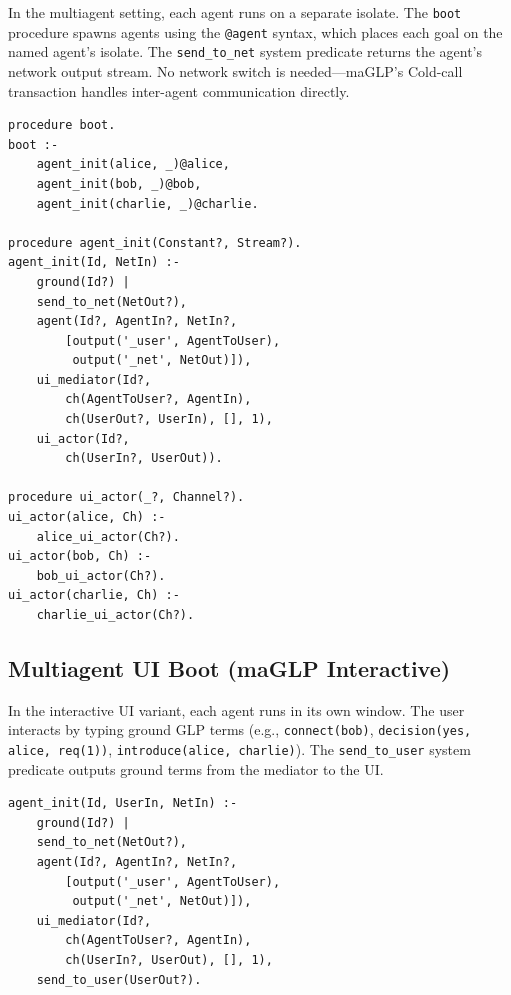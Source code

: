 In the multiagent setting, each agent runs on a separate isolate. The \verb|boot| procedure spawns agents using the \verb|@agent| syntax, which places each goal on the named agent's isolate. The \verb|send_to_net| system predicate returns the agent's network output stream. No network switch is needed---maGLP's Cold-call transaction handles inter-agent communication directly.

\begin{verbatim}
procedure boot.
boot :-
    agent_init(alice, _)@alice,
    agent_init(bob, _)@bob,
    agent_init(charlie, _)@charlie.

procedure agent_init(Constant?, Stream?).
agent_init(Id, NetIn) :-
    ground(Id?) |
    send_to_net(NetOut?),
    agent(Id?, AgentIn?, NetIn?,
        [output('_user', AgentToUser),
         output('_net', NetOut)]),
    ui_mediator(Id?,
        ch(AgentToUser?, AgentIn),
        ch(UserOut?, UserIn), [], 1),
    ui_actor(Id?,
        ch(UserIn?, UserOut)).

procedure ui_actor(_?, Channel?).
ui_actor(alice, Ch) :-
    alice_ui_actor(Ch?).
ui_actor(bob, Ch) :-
    bob_ui_actor(Ch?).
ui_actor(charlie, Ch) :-
    charlie_ui_actor(Ch?).
\end{verbatim}

\subsection{Multiagent UI Boot (maGLP Interactive)}
\label{app:maglp-ui-boot}

In the interactive UI variant, each agent runs in its own window. The user interacts by typing ground GLP terms (e.g., \verb|connect(bob)|, \verb|decision(yes, alice, req(1))|, \verb|introduce(alice, charlie)|). The \verb|send_to_user| system predicate outputs ground terms from the mediator to the UI.

\begin{verbatim}
agent_init(Id, UserIn, NetIn) :-
    ground(Id?) |
    send_to_net(NetOut?),
    agent(Id?, AgentIn?, NetIn?,
        [output('_user', AgentToUser),
         output('_net', NetOut)]),
    ui_mediator(Id?,
        ch(AgentToUser?, AgentIn),
        ch(UserIn?, UserOut), [], 1),
    send_to_user(UserOut?).
\end{verbatim}
